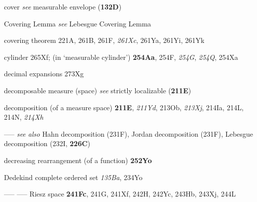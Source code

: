 cover {\it see} measurable envelope ({\bf 132D})


Covering Lemma {\it see} Lebesgue Covering Lemma


















covering theorem 221A,
261B, 261F, {\it 261Xc}, 261Ya, 261Yi, 261Yk




















cylinder 265Xf;
  (in `measurable cylinder') {\bf 254Aa}, 254F, {\it 254G},
{\it 254Q}, 254Xa






\indexmedskip












decimal expansions 273Xg




decomposable measure (space) {\it see} strictly localizable
({\bf 211E})


decomposition (of a measure space) {\bf 211E}, {\it 211Yd}, 213Ob,
{\it 213Xj}, 214Ia, 214L, 214N, {\it 214Xh} 


-----  {\it see also }
  Hahn decomposition (231F),
  Jordan decomposition (231F),
  Lebesgue decomposition (232I, {\bf 226C})


decreasing rearrangement (of a function) {\bf 252Yo}






{Dedekind complete }
ordered set {\it 135Ba}, 234Yo 


----- ----- Riesz space {\bf 241Fc}, 241G, 241Xf, 242H, 242Yc,
243Hb, 243Xj, 244L







